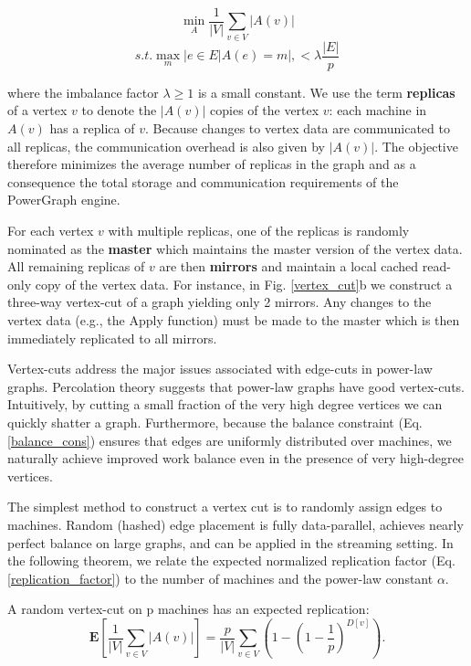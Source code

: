 \documentclass {article}
\begin{document}
\begin{equation}\label{replication_factor}
  \min_A \frac{1}{|V|}\sum_{v\in V}|A(v)|
\end{equation}
\begin{equation}\label{balance_cons}
  s.t. \max_m |{e \in E | A(e)=m}|, < \lambda \frac{|E|}{p}
\end{equation}


where the imbalance factor $\lambda \geq 1$ is a small constant. We
use the term \textbf{replicas} of a vertex $v$ to denote the $|A(v)|$
copies of the vertex $v$: each machine in $A(v)$ has a replica of $v$.
Because changes to vertex data are communicated to all replicas, the
communication overhead is also given by $|A(v)|$. The objective therefore
minimizes the average number of replicas in the graph and as a consequence
the total storage and communication requirements of the PowerGraph engine.

For each vertex $v$ with multiple replicas, one of the
replicas is randomly nominated as the \textbf{master}
which maintains the master version of the vertex data.
All remaining replicas of $v$ are then \textbf{mirrors}
and maintain a local cached read-only copy of the vertex data.
For instance, in Fig. \ref{vertex_cut}b we construct a three-way
vertex-cut of a graph yielding only 2 mirrors. Any changes 
to the vertex data (e.g., the Apply function) must be made to
the master which is then immediately replicated to all mirrors.

Vertex-cuts address the major issues associated with
edge-cuts in power-law graphs. Percolation theory
suggests that power-law graphs have good vertex-cuts.
Intuitively, by cutting a small fraction of the very high
degree vertices we can quickly shatter a graph. 
Furthermore, because the balance constraint (Eq.\ref{balance_cons})
ensures that edges are uniformly distributed over machines, we
naturally achieve improved work balance even in the presence of 
very high-degree vertices.

The simplest method to construct a vertex cut is to
randomly assign edges to machines. Random (hashed)
edge placement is fully data-parallel, achieves nearly perfect 
balance on large graphs, and can be applied in the
streaming setting. In the following theorem, we relate the
expected normalized replication factor (Eq. \ref{replication_factor})
to the number of machines and the power-law constant $\alpha$.

A random vertex-cut on p machines has an expected replication:
\begin{equation}
  \textbf{E}[\frac{1}{|V|}\sum_{v\in V}|A(v)|] = \frac{p}{|V|}
  \sum_{v \in V}(1 - (1-\frac{1}{p})^{D[v]}).
\end{equation}
\end{document}
